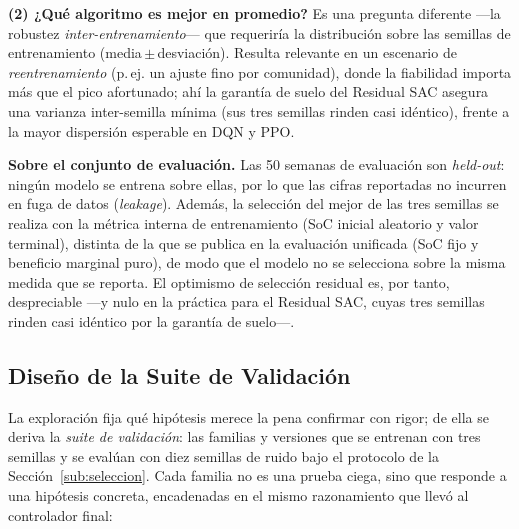 \documentclass[12pt, a4paper, twoside]{report}
\begin{document}
\textbf{(2) ¿Qué algoritmo es mejor en promedio?} Es una pregunta diferente
—la robustez \emph{inter-entrenamiento}— que requeriría la distribución sobre las
semillas de entrenamiento (media\,$\pm$\,desviación). Resulta relevante en un
escenario de \emph{reentrenamiento} (p.\,ej. un ajuste fino por comunidad), donde
la fiabilidad importa más que el pico afortunado; ahí la garantía de suelo del
Residual SAC asegura una varianza inter-semilla mínima (sus tres semillas rinden
casi idéntico), frente a la mayor dispersión esperable en DQN y PPO.

\textbf{Sobre el conjunto de evaluación.} Las 50 semanas de evaluación son
\textit{held-out}: ningún modelo se entrena sobre ellas, por lo que las cifras
reportadas no incurren en fuga de datos (\textit{leakage}). Además, la selección
del mejor de las tres semillas se realiza con la métrica interna de entrenamiento
(SoC inicial aleatorio y valor terminal), distinta de la que se publica en la
evaluación unificada (SoC fijo y beneficio marginal puro), de modo que el modelo
no se selecciona sobre la misma medida que se reporta. El optimismo de selección
residual es, por tanto, despreciable —y nulo en la práctica para el Residual SAC,
cuyas tres semillas rinden casi idéntico por la garantía de suelo—.

\subsection{Diseño de la Suite de Validación}
\label{sub:suite}

La exploración fija qué hipótesis merece la pena confirmar con rigor; de ella se
deriva la \emph{suite de validación}: las familias y versiones que se entrenan con
tres semillas y se evalúan con diez semillas de ruido bajo el protocolo de la
Sección~\ref{sub:seleccion}. Cada familia no es una prueba ciega, sino que responde
a una hipótesis concreta, encadenadas en el mismo razonamiento que llevó al
controlador final:
\end{document}
